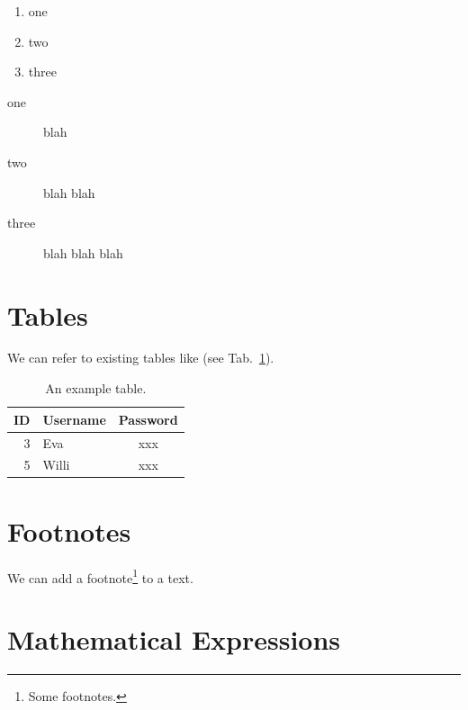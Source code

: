 \begin{appendix}
\begin{enumerate}
  \item one
  \item two
  \item three
\end{enumerate}


\begin{description}
\item[one] blah
\item[two] blah blah
\item[three] blah blah blah
\end{description}

\newpage


\section{Tables}

We can refer to existing tables like (see Tab.~\ref{UserTable}).

\begin{table}[htbp]
\begin{center}
\begin{tabular}{|r||l|c|} 
\hline 
ID 	& Username 	& Password 	\\ 
\hline 
\hline
3 	& Eva 		& xxx 		\\ 
\hline
5 	& Willi 	& xxx 		\\ 
\hline
\end{tabular}
\end{center}
\caption{An example table.}
\label{UserTable}
\end{table}

\newpage


\section{Footnotes}
We can add a footnote\footnote{Some footnotes.}  to a text.


\newpage


\section{Mathematical Expressions}


\end{appendix}
